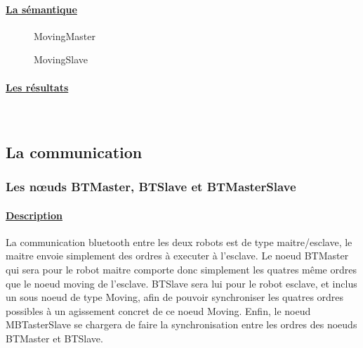     \paragraph{\underline{La sémantique\\}}
    \begin{figure}[!ht]
     \begin{center}
      \caption{MovingMaster}
     \end{center}
    \end{figure}

    \begin{figure}[!ht]
     \begin{center}
      \caption{MovingSlave}
     \end{center}
    \end{figure}

    \paragraph{\underline{Les résultats\\}}
    
    
    ~\newline
    
    
    
  \subsection{La communication}
    
   \subsubsection{Les n\oe{}uds BTMaster, BTSlave et BTMasterSlave}
    
    \paragraph{\underline{Description\\}}
    La communication bluetooth entre les deux robots est de type
    maitre/esclave, le maitre envoie simplement des ordres à executer à
    l'esclave. Le noeud BTMaster qui sera pour le robot maitre comporte
    donc simplement les quatres même ordres que le noeud moving de l'esclave. BTSlave
    sera lui pour le robot esclave, et inclus un sous noeud de type
    Moving, afin de pouvoir synchroniser les quatres ordres possibles à un
    agissement concret de ce noeud Moving. Enfin, le noeud MBTasterSlave se
    chargera de faire la synchronisation entre les ordres des noeuds
    BTMaster et BTSlave.

